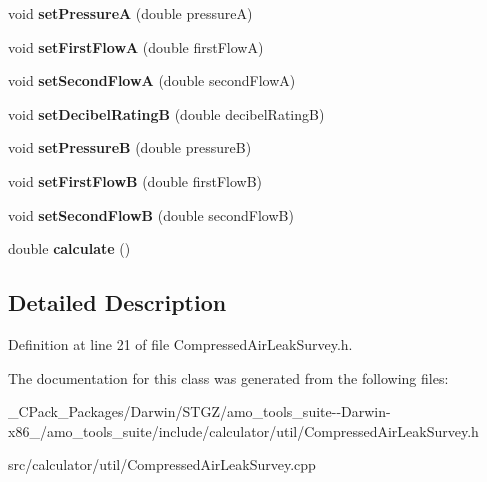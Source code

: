 \begin{DoxyCompactItemize}
void {\bfseries set\+PressureA} (double pressureA)
\item 
\mbox{\label{class_decibels_method_data_a33b5911ea1edc369d7dbc2a6f33fd9ba}} 
void {\bfseries set\+First\+FlowA} (double first\+FlowA)
\item 
\mbox{\label{class_decibels_method_data_acc38b7f9e68051d48c613301e9451e3d}} 
void {\bfseries set\+Second\+FlowA} (double second\+FlowA)
\item 
\mbox{\label{class_decibels_method_data_addb98fc793dec7fe7d789b3f56582a7d}} 
void {\bfseries set\+Decibel\+RatingB} (double decibel\+RatingB)
\item 
\mbox{\label{class_decibels_method_data_a553e41bdd398e74031b899178348afd3}} 
void {\bfseries set\+PressureB} (double pressureB)
\item 
\mbox{\label{class_decibels_method_data_a00d9e5948d8ec010fc141b4939c565a2}} 
void {\bfseries set\+First\+FlowB} (double first\+FlowB)
\item 
\mbox{\label{class_decibels_method_data_a061d9c83fcdc4b9f50d9ba0fb21777f7}} 
void {\bfseries set\+Second\+FlowB} (double second\+FlowB)
\item 
\mbox{\label{class_decibels_method_data_af76c41c665ccd27190eda48f3874ade1}} 
double {\bfseries calculate} ()
\end{DoxyCompactItemize}


\subsection{Detailed Description}


Definition at line 21 of file Compressed\+Air\+Leak\+Survey.\+h.



The documentation for this class was generated from the following files\+:\begin{DoxyCompactItemize}
\item 
\+\_\+\+C\+Pack\+\_\+\+Packages/\+Darwin/\+S\+T\+G\+Z/amo\+\_\+tools\+\_\+suite-\/-\/\+Darwin-\/x86\+\_/amo\+\_\+tools\+\_\+suite/include/calculator/util/Compressed\+Air\+Leak\+Survey.\+h\item 
src/calculator/util/Compressed\+Air\+Leak\+Survey.\+cpp\end{DoxyCompactItemize}
